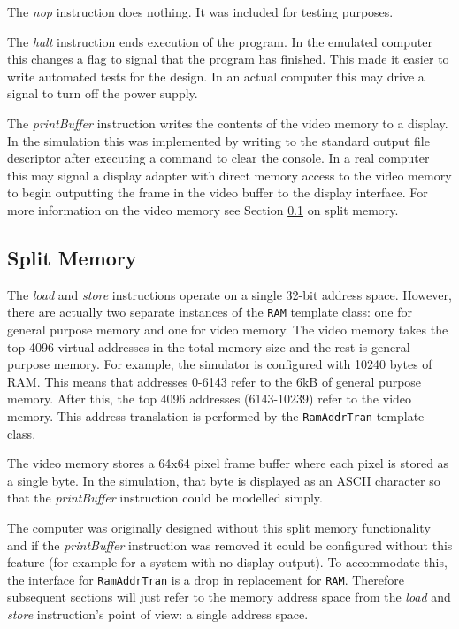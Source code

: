 \documentclass[11pt,a4paper]{IEEEtran}
\begin{document}
				The \textit{nop} instruction does nothing. It was included for testing purposes. 
				
				The \textit{halt} instruction ends execution of the program. In the emulated computer this changes a flag to signal that the program has finished. This made it easier to write automated tests for the design. In an actual computer this may drive a signal to turn off the power supply.
				
				The \textit{printBuffer} instruction writes the contents of the video memory to a display. In the simulation this was implemented by writing to the standard output file descriptor after executing a command to clear the console. In a real computer this may signal a display adapter with direct memory access to the video memory to begin outputting the frame in the video buffer to the display interface. For more information on the video memory see Section \ref{sec::splitMemory} on split memory.
				
		\subsection{Split Memory}
			\label{sec::splitMemory}
			The \textit{load} and \textit{store} instructions operate on a single 32-bit address space. However, there are actually two separate instances of the \texttt{RAM} template class: one for general purpose memory and one for video memory. The video memory takes the top 4096 virtual addresses in the total memory size and the rest is general purpose memory. For example, the simulator is configured with 10240 bytes of RAM. This means that addresses 0-6143 refer to the 6kB of general purpose memory. After this, the top 4096 addresses (6143-10239) refer to the video memory. This address translation is performed by the \texttt{RamAddrTran} template class. 
			
			The video memory stores a 64x64 pixel frame buffer where each pixel is stored as a single byte. In the simulation, that byte is displayed as an ASCII character so that the \textit{printBuffer} instruction could be modelled simply.
			
			The computer was originally designed without this split memory functionality and if the \textit{printBuffer} instruction was removed it could be configured without this feature (for example for a system with no display output). To accommodate this, the interface for \texttt{RamAddrTran} is a drop in replacement for \texttt{RAM}. Therefore subsequent sections will just refer to the memory address space from the \textit{load} and \textit{store} instruction's point of view: a single address space.
		
\end{document}
